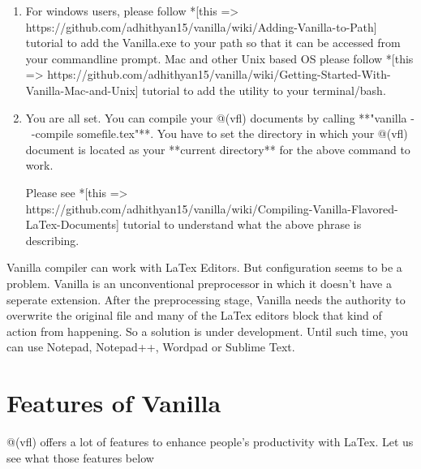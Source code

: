 \documentclass{article}
\begin{document}
\begin{enumerate}
\begin{itemize}
\end{itemize}

\item For windows users, please follow *[this => https://github.com/adhithyan15/vanilla/wiki/Adding-Vanilla-to-Path] tutorial to add the Vanilla.exe to your path so that it can be accessed from your commandline prompt. Mac and other Unix based OS please follow *[this => https://github.com/adhithyan15/vanilla/wiki/Getting-Started-With-Vanilla-Mac-and-Unix] tutorial to add the utility to your terminal/bash. 

\item You are all set. You can compile your @(vfl) documents by calling **"vanilla -~-compile somefile.tex"**. You have to set the directory in which your @(vfl) document is located as your **current directory** for the above command to work.

Please see *[this => https://github.com/adhithyan15/vanilla/wiki/Compiling-Vanilla-Flavored-LaTex-Documents] tutorial to understand what the above phrase is describing.    
 
\end{enumerate}

Vanilla compiler can work with LaTex Editors. But configuration seems to be a problem. Vanilla is an unconventional preprocessor in which it doesn't have a seperate extension. After the preprocessing stage, Vanilla needs the authority to overwrite the original file and many of the LaTex editors block that kind of action from happening. So a solution is under development. Until such time, you can use Notepad, Notepad++, Wordpad or Sublime Text. 

\section*{Features of Vanilla}

@(vfl) offers a lot of features to enhance people's productivity with LaTex. Let us see what those features below
\end{document}
